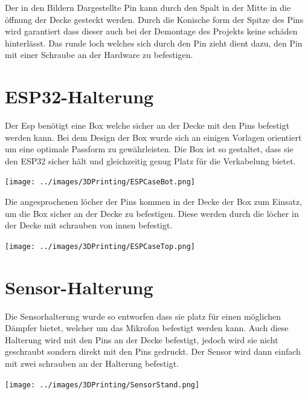 Der in den Bildern Dargestellte Pin kann durch den Spalt in der Mitte in die öffnung der Decke gesteckt werden.
Durch die Konische form der Spitze des Pins wird garantiert dass dieser auch bei der Demontage des Projekts keine schäden hinterlässt.
Das runde loch welches sich durch den Pin zieht dient dazu, den Pin mit einer Schraube an der Hardware zu befestigen.

\section{ESP32-Halterung}
Der Esp benötigt eine Box welche sicher an der Decke mit den Pins befestigt werden kann.
Bei dem Design der Box wurde sich an einigen Vorlagen orientiert um eine optimale Passform zu gewährleisten.
Die Box ist so gestaltet, dass sie den ESP32 sicher hält und gleichzeitig genug Platz für die Verkabelung bietet.

\begin{center}
  \texttt{[image: ../images/3DPrinting/ESPCaseBot.png]}
\end{center}

Die angesprochenen löcher der Pins kommen in der Decke der Box zum Einsatz, um die Box sicher an der Decke zu befestigen.
Diese werden durch die löcher in der Decke mit schrauben von innen befestigt.

\begin{center}
  \texttt{[image: ../images/3DPrinting/ESPCaseTop.png]}
\end{center}

\section{Sensor-Halterung}

Die Sensorhalterung wurde so entworfen dass sie platz für einen möglichen Dämpfer bietet,
welcher um das Mikrofon befestigt werden kann.
Auch diese Halterung wird mit den Pins an der Decke befestigt, jedoch wird sie nicht geschraubt sondern direkt mit den Pins gedruckt.
Der Sensor wird dann einfach mit zwei schrauben an der Halterung befestigt.

\begin{center}
  \texttt{[image: ../images/3DPrinting/SensorStand.png]}
\end{center}

